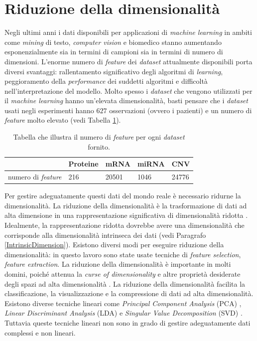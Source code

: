 \documentclass[12pt,italian]{report}
\begin{document}
	\section{Riduzione della dimensionalità}
	Negli ultimi anni i dati disponibili per applicazioni di \textit{machine learning} in ambiti come \textit{mining} di testo, \textit{computer vision} e biomedico stanno aumentando esponenzialmente sia in termini di campioni sia in termini di numero di dimensioni. L'enorme numero di \textit{feature} dei \textit{dataset} attualmente disponibili porta diversi svantaggi: rallentamento significativo degli algoritmi di \textit{learning}, peggioramento della \textit{performance} dei suddetti algoritmi e difficoltà nell'interpretazione del modello. Molto spesso i \textit{dataset} che vengono utilizzati per il \textit{machine learning} hanno un'elevata dimensionalità, basti pensare che i \textit{dataset} usati negli esperimenti hanno $627$ osservazioni (ovvero i pazienti) e un numero di \textit{feature} molto elevato (vedi Tabella \ref{numero_feature}).
	\begin{table}[]
		\begin{center}
			\begin{tabular}{l|llll}
				\hline
				&  Proteine&mRNA  &miRNA  &CNV  \\ \hline
				numero di \textit{feature}&  216&20501  &1046  &24776 
			\end{tabular}
		\end{center}
		\caption{Tabella che illustra il numero di  \textit{feature} per ogni \textit{dataset} fornito.}
		\label{numero_feature}
	\end{table}
	Per gestire adeguatamente questi dati del mondo reale è necessario ridurne la dimensionalità. La riduzione della dimensionalità è la trasformazione di dati ad alta dimensione in una rappresentazione significativa di dimensionalità ridotta \cite{van2009dimensionality}. Idealmente, la rappresentazione ridotta dovrebbe avere una dimensionalità che corrisponde alla dimensionalità intrinseca dei dati (vedi Paragrafo  \ref{IntrinsicDimension}). Esistono diversi modi per eseguire riduzione della dimensionalità: in questo lavoro sono state usate tecniche di \textit{feature selection}, \textit{feature extraction}.
	La riduzione della dimensionalità è importante in molti domini, poiché attenua la \textit{curse of dimensionality} \cite{Keogh2017} e altre proprietà desiderate degli spazi ad alta dimensionalità \cite{Jimenez1998SupervisedCI}. La riduzione della dimensionalità facilita la classificazione, la visualizzazione e la compressione di dati ad alta dimensionalità. Esistono diverse tecniche lineari come \textit{Principal Component Analysis} (PCA) \cite{ringner2008principal}, \textit{Linear Discriminant Analysis} (LDA) \cite{balakrishnama1998linear} e \textit{Singular Value Decomposition} (SVD) \cite{wall2003singular}. Tuttavia queste tecniche lineari non sono in grado di gestire adeguatamente dati complessi e non lineari.
\end{document}
